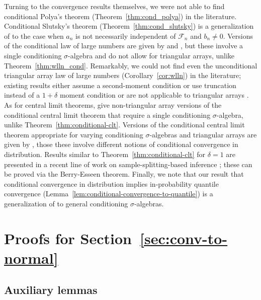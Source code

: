 \documentclass[aos]{imsart}
\theoremstyle{definition}
\theoremstyle{remark}
\begin{document}
Turning to the convergence results themselves, we were not able to find conditional Polya's theorem (Theorem~\ref{thm:cond_polya}) in the literature. Conditional Slutsky's theorem (Theorem~\ref{thm:cond_slutsky}) is a generalization of \citet[Lemma 5]{Wang2020b} to the case when $a_n$ is not necessarily independent of $\mathcal F_n$ and $b_n \neq 0$. Versions of the conditional law of large numbers are given by \cite{Majerek2005a} and \cite{PrakasaRao2009}, but these involve a single conditioning $\sigma$-algebra and do not allow for triangular arrays, unlike Theorem~\ref{thm:wlln_cond}. Remarkably, we could not find even the unconditional triangular array law of large numbers (Corollary~\ref{cor:wlln}) in the literature; existing results either assume a second-moment condition or use truncation \citep[Theorems 2.2.4 and 2.2.6, respectively]{Durrett2010} instead of a $1+\delta$ moment condition or are not applicable to triangular arrays \citep[Lemma 19]{Shah2018}. As for central limit theorems, \citet{Grzenda2008, PrakasaRao2009, Yuan2014} give non-triangular array versions of the conditional central limit theorem that require a single conditioning $\sigma$-algebra, unlike Theorem~\ref{thm:conditional-clt}. Versions of the conditional central limit theorem appropriate for varying conditioning $\sigma$-algebras and triangular arrays are given by \citet{Dedecker2002, bulinski2017conditional}, those these involve different notions of conditional convergence in distribution. Results similar to Theorem~\ref{thm:conditional-clt} for $\delta = 1$ are presented in a recent line of work on sample-splitting-based inference \citep{Kim2020a, Shekhar2022a, Shekhar2022}; these can be proved via the Berry-Esseen theorem. Finally, we note that our result that conditional convergence in distribution implies in-probability quantile convergence (Lemma~\ref{lem:conditional-convergence-to-quantile}) is a generalization of \citet[Lemma 3]{Wang2020b} to general conditioning $\sigma$-algebras.

\section{Proofs for Section~\ref{sec:conv-to-normal}}

\subsection{Auxiliary lemmas}
\end{document}
